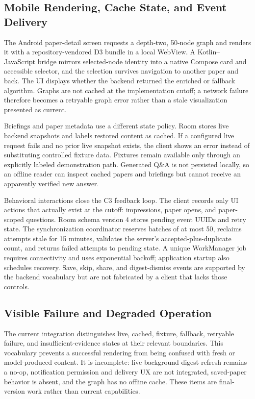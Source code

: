 \subsection{Mobile Rendering, Cache State, and Event Delivery}

The Android paper-detail screen requests a depth-two, 50-node graph and renders it with a repository-vendored D3 bundle in a local WebView. A Kotlin--JavaScript bridge mirrors selected-node identity into a native Compose card and accessible selector, and the selection survives navigation to another paper and back. The UI displays whether the backend returned the enriched or fallback algorithm. Graphs are not cached at the implementation cutoff; a network failure therefore becomes a retryable graph error rather than a stale visualization presented as current.

Briefings and paper metadata use a different state policy. Room stores live backend snapshots and labels restored content as cached. If a configured live request fails and no prior live snapshot exists, the client shows an error instead of substituting controlled fixture data. Fixtures remain available only through an explicitly labeled demonstration path. Generated Q\&A is not persisted locally, so an offline reader can inspect cached papers and briefings but cannot receive an apparently verified new answer.

Behavioral interactions close the C3 feedback loop. The client records only UI actions that actually exist at the cutoff: impressions, paper opens, and paper-scoped questions. Room schema version 4 stores pending event UUIDs and retry state. The synchronization coordinator reserves batches of at most 50, reclaims attempts stale for 15 minutes, validates the server's accepted-plus-duplicate count, and returns failed attempts to pending state. A unique WorkManager job requires connectivity and uses exponential backoff; application startup also schedules recovery. Save, skip, share, and digest-dismiss events are supported by the backend vocabulary but are not fabricated by a client that lacks those controls.

\subsection{Visible Failure and Degraded Operation}

The current integration distinguishes live, cached, fixture, fallback, retryable failure, and insufficient-evidence states at their relevant boundaries. This vocabulary prevents a successful rendering from being confused with fresh or model-produced content. It is incomplete: live background digest refresh remains a no-op, notification permission and delivery UX are not integrated, saved-paper behavior is absent, and the graph has no offline cache. These items are \planned{} final-version work rather than current capabilities.

